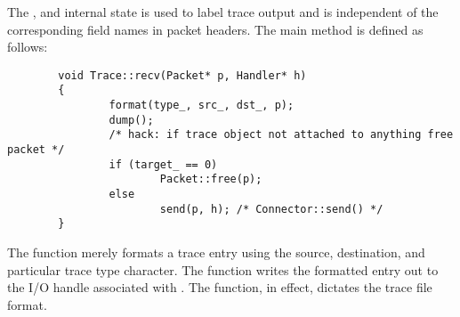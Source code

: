 The , and  internal state is used
to label trace output and is independent of the corresponding field
names in packet headers.
The main  method is defined as follows:
\begin{small}
\begin{verbatim}
        void Trace::recv(Packet* p, Handler* h)
        {
                format(type_, src_, dst_, p);
                dump();
                /* hack: if trace object not attached to anything free packet */
                if (target_ == 0)
                        Packet::free(p);
                else
                        send(p, h); /* Connector::send() */
        }
\end{verbatim}
\end{small}
The function merely formats a trace entry using the source, destination,
and particular trace type character.
The  function writes the formatted entry out to the
I/O handle associated with .
The  function, in effect, dictates the trace file format.

\subsubsection{}

